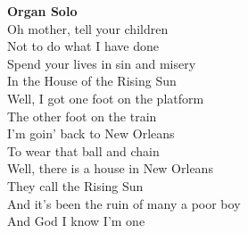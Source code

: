 \documentclass[10pt, twoside, a4paper]{article}
\begin{document}
\textbf{Organ Solo} \\

Oh mother, tell your children \\
Not to do what I have done \\
Spend your lives in sin and misery \\
In the House of the Rising Sun \\

Well, I got one foot on the platform \\
The other foot on the train \\
I'm goin' back to New Orleans \\
To wear that ball and chain \\

Well, there is a house in New Orleans \\
They call the Rising Sun \\
And it's been the ruin of many a poor boy \\
And God I know I'm one \\

\newpage


\end{document}
